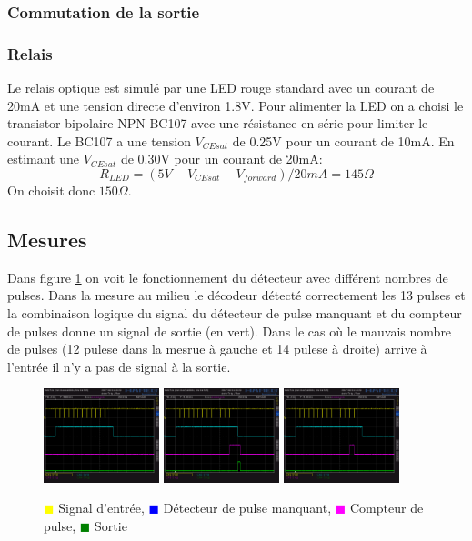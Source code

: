 \documentclass[french]{layout/Report}
\begin{document}
\subsubsection{Commutation de la sortie}
\subsubsection{Relais}
Le relais optique est simulé par une LED rouge standard avec un courant de 20mA et une tension directe d'environ 1.8V.
Pour alimenter la LED on a choisi le transistor bipolaire NPN BC107 avec une résistance en série pour limiter le courant.
Le BC107 a une tension \(V_{CEsat}\) de 0.25V pour un courant de 10mA.
En estimant une \(V_{CEsat}\) de 0.30V pour un courant de 20mA:
\[
R_{LED} = (5V - V_{CEsat} - V_{forward})/20mA = 145\Omega
\]
On choisit donc \(150\Omega\).

\subsection{Mesures}

Dans figure \ref{fig:decoder_signal} on voit le fonctionnement du détecteur avec différent nombres de pulses.
Dans la mesure au milieu le décodeur détecté correctement les 13 pulses et la combinaison logique
du signal du détecteur de pulse manquant et du compteur de pulses donne un signal de sortie (en vert).
Dans le cas où le mauvais nombre  de pulses (12 pulese dans la mesrue à gauche et 14 pulese à droite)
arrive à l'entrée il n'y a pas de signal à la sortie.

\begin{figure}[h]
\centering
\includegraphics[width=0.3\textwidth]{../measurements/SCR06}
\includegraphics[width=0.3\textwidth]{../measurements/SCR07}
\includegraphics[width=0.3\textwidth]{../measurements/SCR08}
\caption{
\textcolor{yellow}{$\blacksquare$} Signal d'entrée,
\textcolor{blue}{$\blacksquare$} Détecteur de pulse manquant,
\textcolor{magenta}{$\blacksquare$} Compteur de pulse,
\textcolor{green}{$\blacksquare$} Sortie
}
\label{fig:decoder_signal}
\end{figure}
\end{document}

